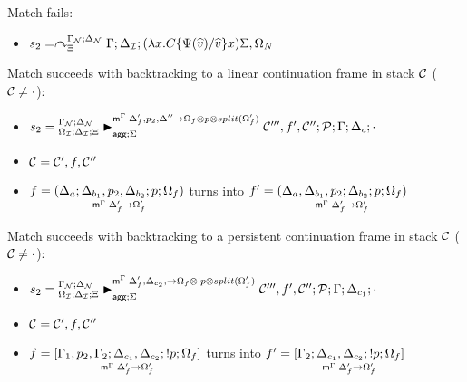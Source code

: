
\item Match fails:
\begin{itemize}[leftmargin=\secondm]
   \item $s_2 = \derstatex{\Gamma}{\deltan}{\Xi}{\gammanew}{\deltanew}
{(\lambda x.  C\{\Psi(\widehat{v})/\widehat{v}\} x) \Sigma,
   \Omega_N}$
\end{itemize}

\item Match succeeds with backtracking to a linear continuation frame in
stack $\lstack{C}$ ($\lstack{C} \neq \cdot$):

\begin{itemize}[leftmargin=\secondm]
   \item $s_2 = \matstatea{\deltan}{\lstack{C'''}, f', \lstack{C''};
                  \lstack{P}}{\Gamma}{\Delta_c}{\cdot}
               {\Delta'_f, p_2, \Delta'' \rightarrow \Omega_f \otimes p
                  \otimes split(\Omega'_f)}{\Sigma}$

   \item $\lstack{C} = \lstack{C'}, f, \lstack{C''}$
   \item $f = \lframe{\Delta_a}{\Delta_{b_1}, p_2,
         \Delta_{b_2}}{p}{\Omega_f}{\Delta_f'}{\Omega'_f}$
         turns into
         $f' = \lframe{\Delta_a, \Delta_{b_1}, p_2}
            {\Delta_{b_2}}{p}{\Omega_f}{\Delta'_f}{\Omega'_f}$
\end{itemize}

\item Match succeeds with backtracking to a persistent continuation frame
in stack $\lstack{C}$ ($\lstack{C} \neq \cdot$):
\begin{itemize}[leftmargin=\secondm]
   \item $s_2 = \matstatea{\deltan}{\lstack{C'''}, f', \lstack{C''};
      \lstack{P}}{\Gamma}{\Delta_{c_1}}{\cdot}{\Delta'_f, \Delta_{c_2}, 
         \rightarrow \Omega_f \otimes \bang p \otimes split(\Omega'_f)}{\Sigma}$

   \item $\lstack{C} = \lstack{C'}, f, \lstack{C''}$

   \item $f = \pframe{\Gamma_1, p_2,
      \Gamma_2}{\Delta_{c_1}, \Delta_{c_2}}{\bang p}{\Omega_f}{\Delta'_f}{\Omega'_f}$
   turns into $f' = \pframe{\Gamma_2}{\Delta_{c_1},
      \Delta_{c_2}}{\bang p}{\Omega_f}{\Delta'_f}{\Omega'_f}$

\end{itemize}

